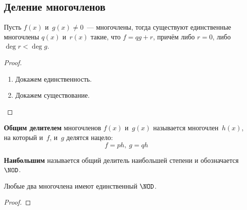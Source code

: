 \subsection{Деление многочленов}
\begin{theorem}
Пусть $f(x)$ и~$g(x) \neq 0$~--- многочлены, тогда существуют единственные многочлены $q(x)$ и~$r(x)$ такие, что $f = qg + r$, причём либо $r = 0$, либо $\deg r < \deg g$.
\end{theorem}
\begin{proof}
\begin{enumerate}
	\item Докажем единственность.
	
	\item Докажем существование.
	
\end{enumerate}
\end{proof}

\textbf{Общим делителем} многочленов $f(x)$ и~$g(x)$ называется многочлен~$h(x)$, на который и~$f$, и~$g$ делятся нацело:
\begin{equation*}
f = ph, \ g = qh
\end{equation*}

\textbf{Наибольшим} называется общий делитель наибольшей степени и обозначается $\NOD$.

\begin{theorem}[Евклида]
Любые два многочлена имеют единственный $\NOD$.
\end{theorem}
\begin{proof}

\end{proof}